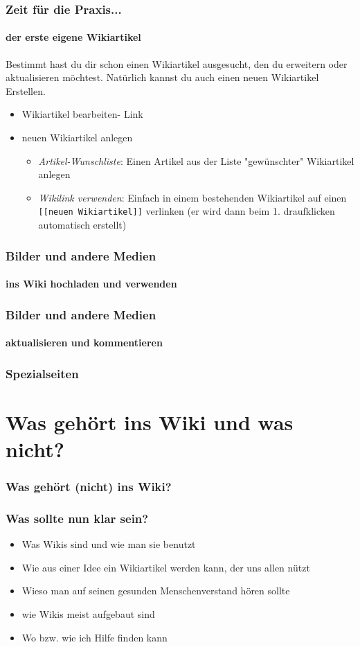 \documentclass{beamer}
\begin{document}
\begin{frame}
  \frametitle{Zeit für die Praxis...}
  \framesubtitle{der erste eigene Wikiartikel}

  Bestimmt hast du dir schon einen Wikiartikel ausgesucht, den du erweitern oder
  aktualisieren möchtest. Natürlich kannst du auch einen neuen Wikiartikel
  Erstellen.
  
  \begin{itemize}
  \item Wikiartikel bearbeiten- Link
  \item neuen Wikiartikel anlegen
    \begin{itemize}
    \item \emph{Artikel-Wunschliste}: Einen Artikel aus der Liste "gewünschter"
      Wikiartikel anlegen
    \item \emph{Wikilink verwenden}: Einfach in einem bestehenden Wikiartikel
      auf einen \texttt{[[neuen Wikiartikel]]} verlinken (er wird dann beim
      1. draufklicken automatisch erstellt)
    \end{itemize}
  \end{itemize}

\end{frame}

\begin{frame}
  \frametitle{Bilder und andere Medien}
  \framesubtitle{ins Wiki hochladen und verwenden}

\end{frame}


\begin{frame}
  \frametitle{Bilder und andere Medien}
  \framesubtitle{aktualisieren und kommentieren}

\end{frame}


\begin{frame}
  \frametitle{Spezialseiten}

\end{frame}

\section{Was gehört ins Wiki und was nicht?}

\begin{frame}
  \frametitle{Was gehört (nicht) ins Wiki?}

\end{frame}

  
\begin{frame}
  \frametitle{Was sollte nun klar sein?}
  \begin{itemize}[<+->]
    \item Was Wikis sind und wie man sie benutzt
    \item Wie aus einer Idee ein Wikiartikel werden kann, der uns allen nützt
    \item Wieso man auf seinen gesunden Menschenverstand hören sollte
    \item wie Wikis meist aufgebaut sind
    \item Wo bzw. wie ich Hilfe finden kann
  \end{itemize}
\end{frame}
\end{document}
